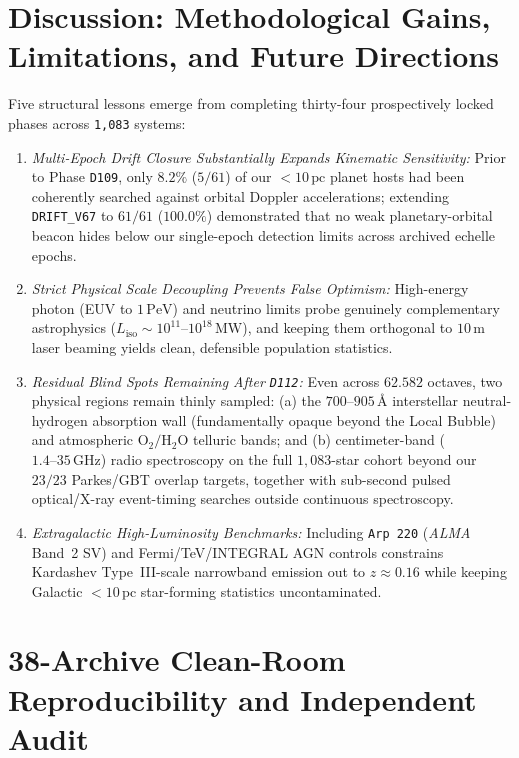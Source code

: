 \documentclass[twocolumn,10pt]{article}
\begin{document}
\section{Discussion: Methodological Gains, Limitations, and Future Directions}
\label{sec:discussion}
Five structural lessons emerge from completing thirty-four prospectively locked phases across \texttt{1,083} systems:
\begin{enumerate}
  \item \textit{Multi-Epoch Drift Closure Substantially Expands Kinematic Sensitivity:} Prior to Phase \texttt{D109}, only $8.2\%$ ($5/61$) of our $<10\,\mathrm{pc}$ planet hosts had been coherently searched against orbital Doppler accelerations; extending \texttt{DRIFT\_V67} to $61/61$ ($100.0\%$) demonstrated that no weak planetary-orbital beacon hides below our single-epoch detection limits across archived echelle epochs.
  \item \textit{Strict Physical Scale Decoupling Prevents False Optimism:} High-energy photon (EUV to $1\,\mathrm{PeV}$) and neutrino limits probe genuinely complementary astrophysics ($L_{\mathrm{iso}} \sim 10^{11}\text{--}10^{18}\,\mathrm{MW}$), and keeping them orthogonal to $10\,\mathrm{m}$ laser beaming yields clean, defensible population statistics.
  \item \textit{Residual Blind Spots Remaining After \texttt{D112}:} Even across $62.582$ octaves, two physical regions remain thinly sampled: (a) the $700\text{--}905\,\text{\AA}$ interstellar neutral-hydrogen absorption wall (fundamentally opaque beyond the Local Bubble) and atmospheric $\mathrm{O_2}/\mathrm{H_2O}$ telluric bands; and (b) centimeter-band ($1.4\text{--}35\,\mathrm{GHz}$) radio spectroscopy on the full $1{,}083$-star cohort beyond our $23/23$ Parkes/GBT overlap targets, together with sub-second pulsed optical/X-ray event-timing searches outside continuous spectroscopy.
  \item \textit{Extragalactic High-Luminosity Benchmarks:} Including \texttt{Arp\,220} (\textit{ALMA} Band~2 SV) and Fermi/TeV/INTEGRAL AGN controls constrains Kardashev Type~III-scale narrowband emission out to $z \approx 0.16$ while keeping Galactic $<10\,\mathrm{pc}$ star-forming statistics uncontaminated.
\end{enumerate}

\section{38-Archive Clean-Room Reproducibility and Independent Audit}
\label{sec:repro}
\end{document}
